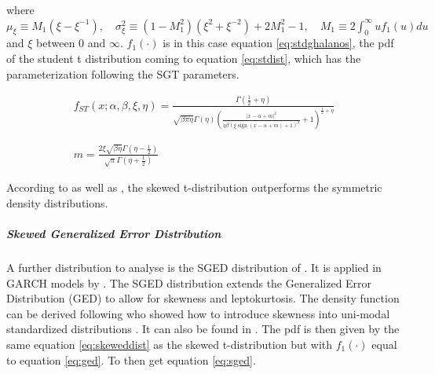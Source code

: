 \documentclass[a4paper, twoside]{templates/ociamthesis}
\begin{document}
\noindent where \(\mu_{\xi} \equiv M_{1}\left(\xi-\xi^{-1}\right), \quad \sigma_{\xi}^{2} \equiv\left(1-M_{1}^{2}\right)\left(\xi^{2}+\xi^{-2}\right)+2 M_{1}^{2}-1, \quad M_{1} \equiv 2 \int_{0}^{\infty} u f_{1}(u) d u\) and \(\xi\) between \(0\) and \(\infty\). \(f_1(\cdot)\) is in this case equation \eqref{eq:stdghalanos}, the pdf of the student t distribution coming to equation \eqref{eq:stdist}, which has the parameterization following the SGT parameters.

\begin{equation}
\begin{array}{c}f_{S T}(x ; \alpha, \beta, \xi, \eta)=\frac{\Gamma\left(\frac{1}{2}+\eta\right)}{\sqrt{\beta\pi \eta} \Gamma(\eta)\left(\frac{|x-\alpha+m|^{2}}{\eta\beta(\xi \operatorname{sign}(x-\alpha+m)+1)^{2}}+1\right)^{\frac{1}{2}+\eta}} \\ \\ \\ m=\frac{2 \xi \sqrt{\beta\eta} \Gamma\left(\eta-\frac{1}{2}\right)}{\sqrt{\pi} \Gamma\left(\eta+\frac{1}{2}\right)}\end{array}
 \label{eq:stdist}
\end{equation}

\noindent According to \textcite{giot2003} as well as \textcite{giot2004}, the skewed t-distribution outperforms the symmetric density distributions.

\hypertarget{skewed-generalized-error-distribution}{%
\subparagraph{Skewed Generalized Error Distribution}\label{skewed-generalized-error-distribution}}

\noindent A further distribution to analyse is the SGED distribution of \textcite{theodossiou2000}. It is applied in GARCH models by \textcite{lee2008}. The SGED distribution extends the Generalized Error Distribution (GED) to allow for skewness and leptokurtosis. The density function can be derived following \textcite{fernández1998} who showed how to introduce skewness into uni-modal standardized distributions \autocite{trottier2015}. It can also be found in \textcite{theodossiou2000}. The pdf is then given by the same equation \eqref{eq:skeweddist} as the skewed t-distribution but with \(f_1(\cdot)\) equal to equation \eqref{eq:ged}. To then get equation \eqref{eq:sged}.
\end{document}
